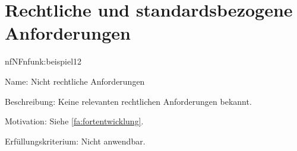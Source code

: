 \section{Rechtliche und standardsbezogene Anforderungen}


\begin{description}[leftmargin=5em, style=sameline]	
	\begin{lhp}{nf}{NF}{nfunk:beispiel12}
		\item [Name:] Nicht rechtliche Anforderungen
		\item [Beschreibung:] Keine relevanten rechtlichen Anforderungen bekannt.
		\item [Motivation:] Siehe \ref{fa:fortentwicklung}.
		\item [Erfüllungskriterium:] Nicht anwendbar.
	\end{lhp}
\end{description}
